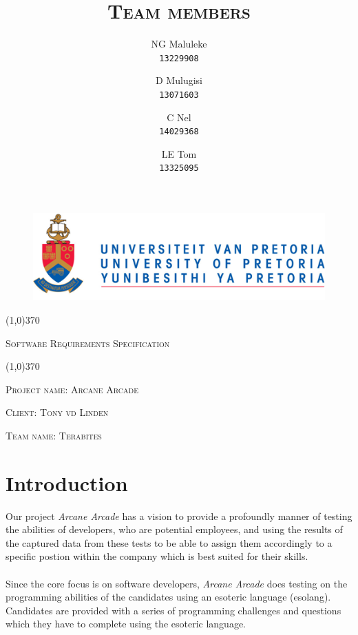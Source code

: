 \documentclass[english]{article}
\title{\scshape\Large Team members}
\author{
	NG Maluleke\\
	\texttt{13229908}
	\and
	D Mulugisi\\
	\texttt{13071603}
	\and
	C Nel\\
	\texttt{14029368}
	\and
	LE Tom\\
	\texttt{13325095}
}
\begin{document}
	
	\begin{figure}
		\includegraphics[width=\linewidth]{up_logo.png}
	\end{figure}
	
	\begin{center}
	 \line(1,0){370}
	\\[0.2cm]
    {\scshape\Large Software Requirements Specification \par}
	\vspace{0.1cm}
	\line(1,0){370}
	\\[0.8cm]
	
	{\scshape\large Project name: Arcane Arcade\par}	
	\vspace{1cm}
	{\scshape\large Client: Tony vd Linden\par}
	\vspace{1cm}
	{\scshape\large Team name: Terabites\par}
	\vspace{1cm}
	{\let\newpage\relax\maketitle}
	\end{center}
	
	
	\newpage
	\tableofcontents

	\newpage
	
	\section{Introduction}
		Our project \textit{Arcane Arcade} has a vision to provide a profoundly manner of testing the abilities of developers, who are potential employees, and using the results of the captured
		data from these tests to be able to assign them accordingly to a specific postion within the company which is best suited for their skills.\\\\
		Since the core focus is on software developers, \textit{Arcane Arcade} does testing on the programming abilities of the candidates using an esoteric language (esolang). Candidates are 
		provided with a series of programming challenges and questions which they have to complete using the esoteric language.
\end{document}
